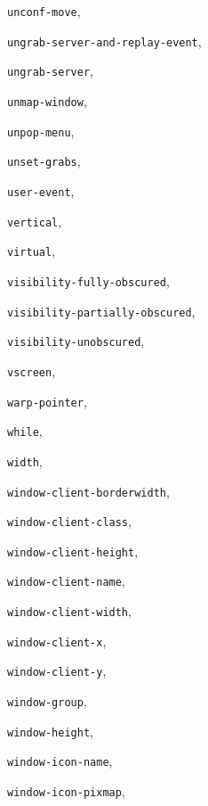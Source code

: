\begin{theindex}
\item {\tt unconf-move}, {\bf\pageref{unconf-move}}
\item {\tt ungrab-server-and-replay-event}, {\bf\pageref{ungrab-server-and-replay-event}}
\item {\tt ungrab-server}, {\bf\pageref{ungrab-server}}
\item {\tt unmap-window}, {\bf\pageref{unmap-window}}
\item {\tt unpop-menu}, {\bf\pageref{unpop-menu}}
\item {\tt unset-grabs}, {\bf\pageref{unset-grabs}}
\item {\tt user-event}, {\bf\pageref{user-event}}
\item {\tt vertical}, {\bf\pageref{vertical}}
\item {\tt virtual}, {\bf\pageref{virtual}}
\item {\tt visibility-fully-obscured}, {\bf\pageref{visibility-fully-obscured}}
\item {\tt visibility-partially-obscured}, {\bf\pageref{visibility-partially-obscured}}
\item {\tt visibility-unobscured}, {\bf\pageref{visibility-unobscured}}
\item {\tt vscreen}, {\bf\pageref{vscreen}}
\item {\tt warp-pointer}, {\bf\pageref{warp-pointer}}
\item {\tt while}, {\bf\pageref{while}}
\item {\tt width}, {\bf\pageref{width}}
\item {\tt window-client-borderwidth}, {\bf\pageref{window-client-borderwidth}}
\item {\tt window-client-class}, {\bf\pageref{window-client-class}}
\item {\tt window-client-height}, {\bf\pageref{window-client-height}}
\item {\tt window-client-name}, {\bf\pageref{window-client-name}}
\item {\tt window-client-width}, {\bf\pageref{window-client-width}}
\item {\tt window-client-x}, {\bf\pageref{window-client-x}}
\item {\tt window-client-y}, {\bf\pageref{window-client-y}}
\item {\tt window-group}, {\bf\pageref{window-group}}
\item {\tt window-height}, {\bf\pageref{window-height}}
\item {\tt window-icon-name}, {\bf\pageref{window-icon-name}}
\item {\tt window-icon-pixmap}, {\bf\pageref{window-icon-pixmap}}

\end{theindex}
